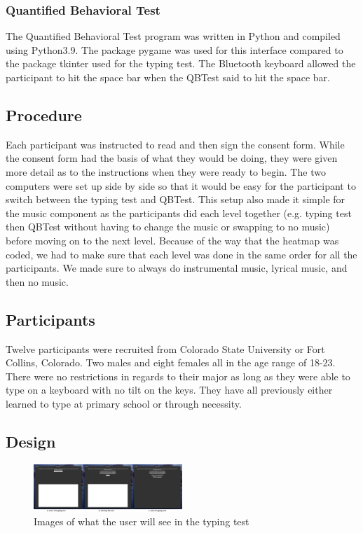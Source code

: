 \documentclass[manuscript, screen, review]{acmart} %
\begin{document}
\subsubsection{Quantified Behavioral Test}
The Quantified Behavioral Test program was written in Python and compiled using Python3.9.
The package pygame was used for this interface compared to the package tkinter used for the typing test.
The Bluetooth keyboard allowed the participant to hit the space bar when the QBTest said to hit the space bar.

\subsection[short]{Procedure}
Each participant was instructed to read and then sign the consent form. While the consent form had the basis of what they would be doing, they were given more detail as to the instructions when they were ready to begin.
The two computers were set up side by side so that it would be easy for the participant to switch between the typing test and QBTest.
This setup also made it simple for the music component as the participants did each level together 
(e.g. typing test then QBTest without having to change the music or swapping to no music)
before moving on to the next level. 
Because of the way that the heatmap was coded, we had to make sure that each level was done in the same order for all the participants.
We made sure to always do instrumental music, lyrical music, and then no music. 

\subsection[short]{Participants}
Twelve participants were recruited from Colorado State University or Fort Collins, Colorado. Two males and eight females all in the age range of 18-23. There were no restrictions in regards to their major as long as they were able to type on a keyboard with no tilt on the keys.
They have all previously either learned to type at primary school or through necessity.

\subsection[short]{Design}

\begin{figure}
  \includegraphics[width=0.5\textwidth]{typingTest}
  \caption{Images of what the user will see in the typing test}
  \label{typingTest}
\end{figure}
\end{document}
